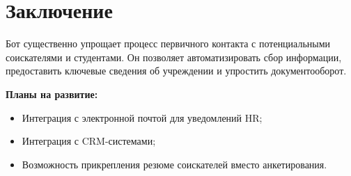 \documentclass[a4paper,12pt]{article} %
\begin{document}
\section{Заключение} %
Бот существенно упрощает процесс первичного контакта с потенциальными соискателями и студентами. Он позволяет автоматизировать сбор информации, предоставить ключевые сведения об учреждении и упростить документооборот.

\textbf{Планы на развитие:} %
\begin{itemize}
    \item Интеграция с электронной почтой для уведомлений HR; %
    \item Интеграция с CRM-системами; %
    \item Возможность прикрепления резюме соискателей вместо анкетирования. %
\end{itemize}
\end{document}
